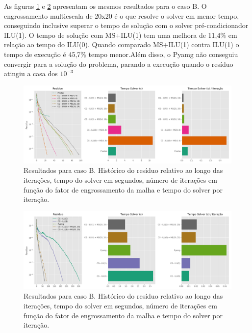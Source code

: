 As figuras \ref{fig:reservatorio320x320_1} e \ref{fig:reservatorio320x320_2} apresentam os mesmos resultados para o caso B.
O engrossamento multiescala de 20x20 é o que resolve o solver em menor tempo, conseguindo inclusive superar o tempo de solução com o solver pré-condicionador ILU(1). O tempo de solução com MS+ILU(1) tem uma melhora de 11,4\% em relação ao tempo do ILU(0). Quando comparado MS+ILU(1) contra ILU(1) o tempo de execução é 45,7\% tempo menor.Além disso, o Pyamg não conseguiu convergir para a solução do problema, parando a execução quando o resíduo atingiu a casa dos $10^{-3}$


\begin{figure}[!htbp]
\centering
\includegraphics[width=\textwidth]{chap08/figs/reservatorio320x320_1.png}
\caption{Resultados para caso B. Histórico do resíduo relativo ao longo das iterações, tempo do solver em segundos, número de iterações em função do fator de engrossamento da malha e tempo do solver por iteração. }
\label{fig:reservatorio320x320_1} 
\end{figure}


\begin{figure}[!htbp]
\centering
\includegraphics[width=\textwidth]{chap08/figs/reservatorio320x320_2.png}
\caption{Resultados para caso B. Histórico do resíduo relativo ao longo das iterações, tempo do solver em segundos, número de iterações em função do fator de engrossamento da malha e tempo do solver por iteração. }
\label{fig:reservatorio320x320_2}
\end{figure}


